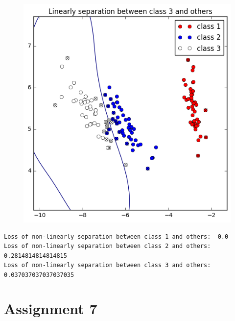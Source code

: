\documentclass[a4paper,11pt]{article}
\begin{document}
\begin{figure}[htbp]
  \includegraphics[scale=0.3]{nl3_12.png}
\end{figure}

\begin{verbatim}
Loss of non-linearly separation between class 1 and others:  0.0
Loss of non-linearly separation between class 2 and others:  0.2814814814814815
Loss of non-linearly separation between class 3 and others:  0.037037037037037035
\end{verbatim}

\section*{Assignment 7}
\end{document}
